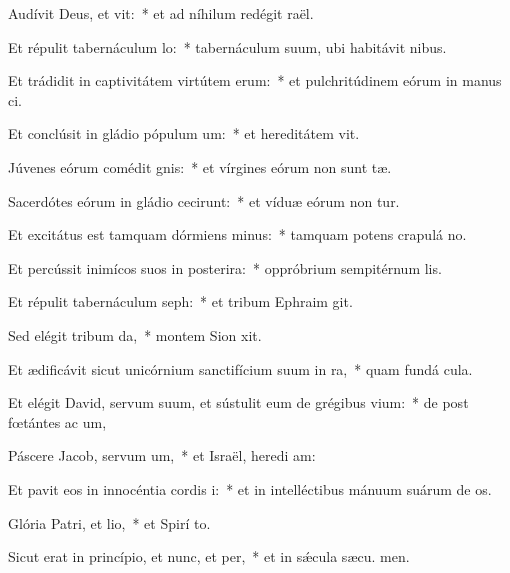 \item Audívit Deus, et vit:~* et ad níhilum redégit  raël.
\item Et répulit tabernáculum lo:~* tabernáculum suum, ubi habitávit  nibus.
\item Et trádidit in captivitátem virtútem erum:~* et pulchritúdinem eórum in manus ci.
\item Et conclúsit in gládio pópulum um:~* et hereditátem  vit.
\item Júvenes eórum comédit gnis:~* et vírgines eórum non sunt tæ.
\item Sacerdótes eórum in gládio cecirunt:~* et víduæ eórum non tur.
\item Et excitátus est tamquam dórmiens minus:~* tamquam potens crapulá  no.
\item Et percússit inimícos suos in posterira:~* oppróbrium sempitérnum  lis.
\item Et répulit tabernáculum seph:~* et tribum Ephraim  git.
\item Sed elégit tribum da,~* montem Sion  xit.
\item Et ædificávit sicut unicórnium sanctifícium suum in ra,~* quam fundá  cula.
\item Et elégit David, servum suum, et sústulit eum de grégibus vium:~* de post fœtántes ac um,
\item Páscere Jacob, servum um,~* et Israël, heredi am:
\item Et pavit eos in innocéntia cordis i:~* et in intelléctibus mánuum suárum de os.
\item Glória Patri, et lio,~* et Spirí to.
\item Sicut erat in princípio, et nunc, et per,~* et in sǽcula sæcu. men.
